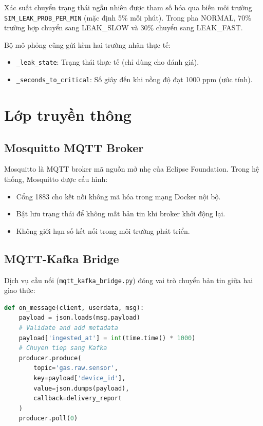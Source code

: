 Xác suất chuyển trạng thái ngẫu nhiên được tham số hóa qua biến môi trường \texttt{SIM\_LEAK\_PROB\_PER\_MIN} (mặc định 5\% mỗi phút). Trong pha NORMAL, 70\% trường hợp chuyển sang LEAK\_SLOW và 30\% chuyển sang LEAK\_FAST.

Bộ mô phỏng cũng gửi kèm hai trường nhãn thực tế:
\begin{itemize}
  \item \texttt{\_leak\_state}: Trạng thái thực tế (chỉ dùng cho đánh giá).
  \item \texttt{\_seconds\_to\_critical}: Số giây đến khi nồng độ đạt 1000 ppm (ước tính).
\end{itemize}

\section{Lớp truyền thông}

\subsection{Mosquitto MQTT Broker}

Mosquitto là MQTT broker mã nguồn mở nhẹ của Eclipse Foundation. Trong hệ thống, Mosquitto được cấu hình:
\begin{itemize}
  \item Cổng 1883 cho kết nối không mã hóa trong mạng Docker nội bộ.
  \item Bật lưu trạng thái để không mất bản tin khi broker khởi động lại.
  \item Không giới hạn số kết nối trong môi trường phát triển.
\end{itemize}

\subsection{MQTT-Kafka Bridge}

Dịch vụ cầu nối (\texttt{mqtt\_kafka\_bridge.py}) đóng vai trò chuyển bản tin giữa hai giao thức:

\begin{lstlisting}[language=Python, caption={Logic bridge đơn giản hóa}]
def on_message(client, userdata, msg):
    payload = json.loads(msg.payload)
    # Validate and add metadata
    payload['ingested_at'] = int(time.time() * 1000)
    # Chuyen tiep sang Kafka
    producer.produce(
        topic='gas.raw.sensor',
        key=payload['device_id'],
        value=json.dumps(payload),
        callback=delivery_report
    )
    producer.poll(0)
\end{lstlisting}


